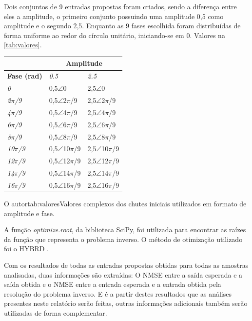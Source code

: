 Dois conjuntos de 9 entradas propostas foram criados, sendo a diferença entre eles a amplitude, o primeiro conjunto possuindo uma amplitude 0,5 como amplitude e o segundo 2,5. Enquanto as 9 fases escolhida foram distribuídas de forma uniforme ao redor do círculo unitário, iniciando-se em 0. Valores na \autoref{tab:valores}.
{
\begin{tabular}{l|l|l}
\hline
    & \multicolumn{2}{c}{\textbf{Amplitude}} \\ \hline
    \textbf{Fase (rad)} & \textit{0.5} & \textit{2.5} \\ \hline
    \textit{0}& 0,5$\angle$0 & 2,5$\angle$0 \\ \hline
    \textit{2$\pi$/9} & 0,5$\angle$2$\pi$/9  & 2,5$\angle$2$\pi$/9  \\ \hline
    \textit{4$\pi$/9} & 0,5$\angle$4$\pi$/9  & 2,5$\angle$4$\pi$/9  \\ \hline
    \textit{6$\pi$/9} & 0,5$\angle$6$\pi$/9  & 2,5$\angle$6$\pi$/9  \\ \hline
    \textit{8$\pi$/9} & 0,5$\angle$8$\pi$/9  & 2,5$\angle$8$\pi$/9  \\ \hline
    \textit{10$\pi$/9}& 0,5$\angle$10$\pi$/9 & 2,5$\angle$10$\pi$/9 \\ \hline
    \textit{12$\pi$/9}& 0,5$\angle$12$\pi$/9 & 2,5$\angle$12$\pi$/9 \\ \hline
    \textit{14$\pi$/9}& 0,5$\angle$14$\pi$/9 & 2,5$\angle$14$\pi$/9 \\ \hline
    \textit{16$\pi$/9}& 0,5$\angle$16$\pi$/9 & 2,5$\angle$16$\pi$/9 \\ \hline
\end{tabular}
\label{tab:valores}
}
{O autor}{tab:valores}{}{Valores complexos dos chutes iniciais utilizados em formato de amplitude e fase.}

A função \textit{optimize.root}, da biblioteca SciPy, foi utilizada para encontrar as raízes da função que representa o problema inverso. O método de otimização utilizado foi o HYBRD \cite{powell1970hybrid}.

Com os resultados de todas as entradas propostas obtidas para todas as amostras analisadas, duas informações são extraídas: O NMSE entre a saída esperada e a saída obtida e o NMSE entre a entrada esperada e a entrada obtida pela resolução do problema inverso. E é a partir destes resultados que as análises presentes neste relatório serão feitas, outras informações adicionais também serão utilizadas de forma complementar.

